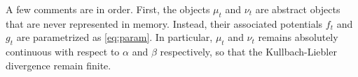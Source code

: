 A few comments are in order. First, the objects $\mu_t$ and $\nu_t$ are abstract
objects that are never represented in memory. Instead, their associated
potentials $f_t$ and $g_t$ are parametrized as \eqref{eq:param}. In particular,
$\mu_t$ and $\nu_t$ remains absolutely continuous with respect to $\alpha$ and
$\beta$ respectively, so that the Kullbach-Liebler divergence remain finite.















